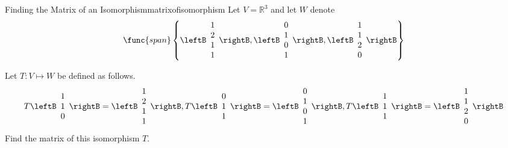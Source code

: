 \begin{example}{Finding the Matrix of an Isomorphism}{matrixofisomorphism}
Let $V=\mathbb{R}^{3}$ and let $W$ denote 
\begin{equation*}
\func{span}\left\{ \leftB 
\begin{array}{c}
1 \\ 
2 \\ 
1 \\ 
1
\end{array}
\rightB ,\leftB 
\begin{array}{c}
0 \\ 
1 \\ 
0 \\ 
1
\end{array}
\rightB ,\leftB 
\begin{array}{c}
1 \\ 
1 \\ 
2 \\ 
0
\end{array}
\rightB \right\}
\end{equation*}

Let $T: V \mapsto W$ be defined as follows. 
\begin{equation*}
T\leftB 
\begin{array}{c}
1 \\ 
1 \\ 
0
\end{array}
\rightB =\leftB 
\begin{array}{c}
1 \\ 
2 \\ 
1 \\ 
1
\end{array}
\rightB ,T\leftB 
\begin{array}{c}
0 \\ 
1 \\ 
1
\end{array}
\rightB =\leftB 
\begin{array}{c}
0 \\ 
1 \\ 
0 \\ 
1
\end{array}
\rightB ,T\leftB 
\begin{array}{c}
1 \\ 
1 \\ 
1
\end{array}
\rightB =\leftB 
\begin{array}{c}
1 \\ 
1 \\ 
2 \\ 
0
\end{array}
\rightB
\end{equation*}
Find the matrix of this isomorphism $T$.
\end{example}

